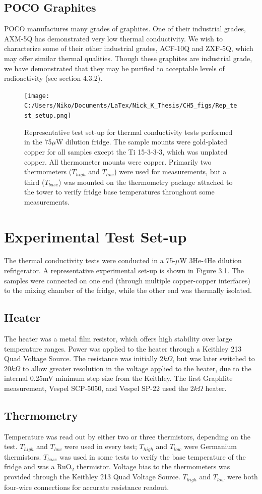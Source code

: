 \documentclass{report}
\begin{document}
\subsection{POCO Graphites}
POCO manufactures many grades of graphites. One of their industrial grades, AXM-5Q has demonstrated very low thermal conductivity. We wish to characterize some of their other industrial grades, ACF-10Q and ZXF-5Q, which may offer similar thermal qualities. Though these graphites are industrial grade, we have demonstrated that they may be purified to acceptable levels of radioactivity (see section 4.3.2).

\begin{figure}[h]
\centering
\texttt{[image: C:/Users/Niko/Documents/LaTex/Nick\_K\_Thesis/CH5\_figs/Rep\_test\_setup.png]}
\caption{Representative test set-up for thermal conductivity tests performed in the 75$\mu$W dilution fridge. The sample mounts were gold-plated copper for all samples except the Ti 15-3-3-3, which was unplated copper. All thermometer mounts were copper. Primarily two thermometers ($T_{high}$ and $T_{low}$) were used for measurements, but a third ($T_{base}$) was mounted on the thermometry package attached to the tower to verify fridge base temperatures throughout some measurements. }
\end{figure}
\section{Experimental Test Set-up}
The thermal conductivity tests were conducted in a 75-$\mu$W 3He-4He dilution refrigerator. A representative experimental set-up is shown in Figure 3.1. The samples were connected on one end (through multiple copper-copper interfaces) to the mixing chamber of the fridge, while the other end was thermally isolated.

\subsection{Heater}
The heater was a metal film resistor, which offers high stability over large temperature ranges. Power was applied to the heater through a Keithley 213 Quad Voltage Source. The resistance was initially 2$k\Omega$, but was later switched to 20$k\Omega$ to allow greater resolution in the voltage applied to the heater, due to the internal 0.25mV minimum step size from the Keithley. The first Graphlite measurement, Vespel SCP-5050, and Vespel SP-22 used the 2$k\Omega$ heater.

\subsection{Thermometry}
Temperature was read out by either two or three thermistors, depending on the test. $T_{high}$ and $T_{low}$ were used in every test; $T_{high}$ and $T_{low}$ were Germanium thermistors. $T_{base}$ was used in some tests to verify the base temperature of the fridge and was a RuO$_{2}$ thermistor. Voltage bias to the thermometers was provided through the Keithley 213 Quad Voltage Source. $T_{high}$ and $T_{low}$ were both four-wire connections for accurate resistance readout.
\end{document}
